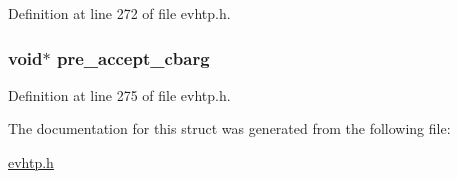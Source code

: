 Definition at line 272 of file evhtp.\-h.

\hypertarget{structevhtp__defaults__s_a0f92afb003b402ad524c0a95d13b4fb7}{
\subsubsection[{pre\-\_\-accept\-\_\-cbarg}]{\setlength{\rightskip}{0pt plus 5cm}void$\ast$ pre\-\_\-accept\-\_\-cbarg}}\label{structevhtp__defaults__s_a0f92afb003b402ad524c0a95d13b4fb7}


Definition at line 275 of file evhtp.\-h.



The documentation for this struct was generated from the following file\-:\begin{DoxyCompactItemize}
\item 
\hyperlink{evhtp_8h}{evhtp.\-h}\end{DoxyCompactItemize}
